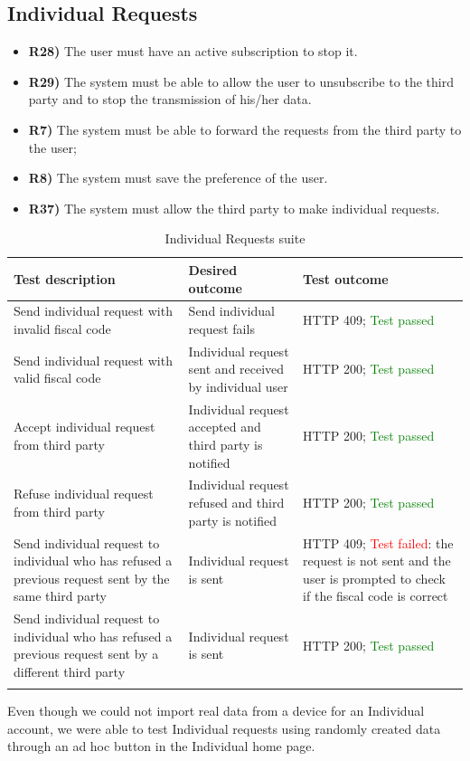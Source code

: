 \documentclass[titlepage]{article}
\begin{document}
\subsection{Individual Requests}
\begin{itemize}
    \item {\bf R28)} The user must have an active subscription to stop it.
    \item {\bf R29)} The system must be able to allow the user to unsubscribe to the third party and to stop the transmission of his/her data.
    \item {\bf R7)} The system must be able to forward the requests from the third party to the user;
    \item {\bf R8)} The system must save the preference of the user.
    \item {\bf R37)} The system must allow the third party to make individual requests.
\end{itemize}

\begin{longtable}{| p{3 cm} | p{4 cm} | p{4 cm} |} \hline
    {\bf Test description} & {\bf Desired outcome} & {\bf Test outcome} \\ \hline
    Send individual request with invalid fiscal code & 
    Send individual request fails
        & HTTP 409; \textcolor{green}{Test passed}\\ \hline
    Send individual request with valid fiscal code & 
    Individual request sent and received by individual user
        & HTTP 200; \textcolor{green}{Test passed}\\ \hline
    Accept individual request from third party & 
    Individual request accepted and third party is notified
        & HTTP 200; \textcolor{green}{Test passed} \\ \hline
    Refuse individual request from third party & 
    Individual request refused and third party is notified
        & HTTP 200; \textcolor{green}{Test passed}\\ \hline
    Send individual request to individual who has refused a previous request sent by the same third party & 
    Individual request is sent
        & HTTP 409; \textcolor{red}{Test failed}: the request is not sent and the user is prompted to check if the fiscal code is correct\\ \hline
    Send individual request to individual who has refused a previous request sent by a different third party & 
    Individual request is sent
        & HTTP 200; \textcolor{green}{Test passed}\\ \hline
    \caption{Individual Requests suite}
\end{longtable}
\noindent
Even though we could not import real data from a device for an Individual account, we were able to test Individual requests using randomly created data through an ad hoc button in the Individual home page.
\end{document}
